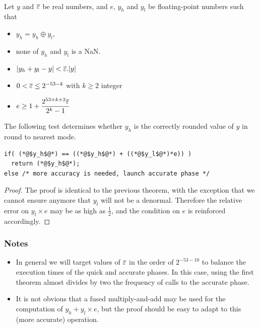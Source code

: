 \begin{theorem}
\label{th:roundingRN2}
~\\
  Let $y$ and ${\overline{\varepsilon}}$ be real numbers, and $e$, $y_h$ and $y_l$ be
  floating-point numbers such that 
  \begin{itemize}
  \item $y_h=y_h\oplus y_l$,
  \item none of $y_h$ and $y_l$ is a  NaN.
  \item $|y_h+y_l - y| <{\overline{\varepsilon}}.|y|$
  \item $0<{\overline{\varepsilon}} \le 2^{-53-k}$ with $k\ge 2$ integer
  \item $e\ge 1+  \dfrac{2^{53+k+2}{\overline{\varepsilon}}}{2^{k}-1}$
\end{itemize}

The following test determines whether $y_h$ is the
  correctly rounded value of $y$ in  round to nearest mode.

\begin{lstlisting}[firstnumber=1,caption={Test for rounding to the nearest}]
if( (*@$y_h$@*) == ((*@$y_h$@*) + ((*@$y_l$@*)*e)) )
  return (*@$y_h$@*);
else /* more accuracy is needed, launch accurate phase */
\end{lstlisting}
\end{theorem}

\begin{proof}
  The proof is identical to the previous theorem, with the exception
  that we cannot ensure anymore that $y_l$ will not be a denormal.
  Therefore the relative error on $y_l\times e$ may be as high as
  $\frac{1}{2}$, and the condition on $e$ is reinforced accordingly.
\end{proof}


\subsubsection*{Notes}

\begin{itemize}
\item In general we will target values of ${\overline{\varepsilon}}$ in the order of
  $2^{-53-10}$ to balance the execution times of the quick and
  accurate phases. In this case, using the first theorem almost divides
  by two the frequency of calls to the accurate phase. 
\item It is not obvious that a fused multiply-and-add may be used for
  the computation of $y_h+y_l\times e$, but the proof should be easy
  to adapt to this (more accurate) operation.
\end{itemize}



